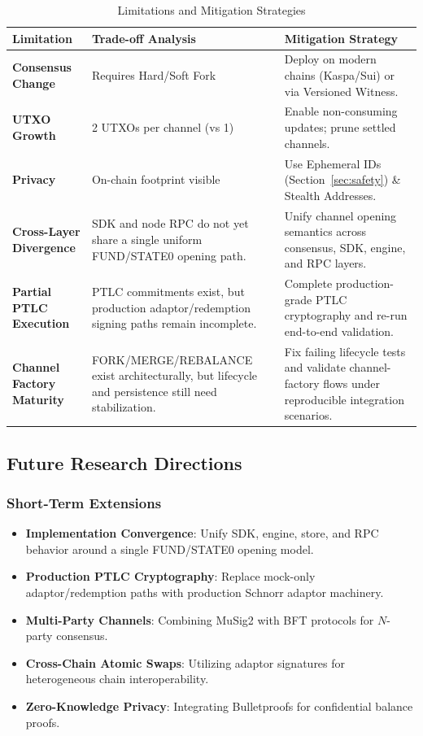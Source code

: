 \begin{table}[htbp]
\centering
\caption{Limitations and Mitigation Strategies}
\label{tab:limitations}
\small
\begin{tabularx}{\linewidth}{@{}l X X@{}}
\toprule
\textbf{Limitation} & \textbf{Trade-off Analysis} & \textbf{Mitigation Strategy} \\
\midrule
\textbf{Consensus Change} & Requires Hard/Soft Fork & Deploy on modern chains (Kaspa/Sui) or via Versioned Witness. \\
\midrule
\textbf{UTXO Growth} & 2 UTXOs per channel (vs 1) & Enable non-consuming updates; prune settled channels. \\
\midrule
\textbf{Privacy} & On-chain footprint visible & Use Ephemeral IDs (Section~\ref{sec:safety}) \& Stealth Addresses. \\
\midrule
\textbf{Cross-Layer Divergence} & SDK and node RPC do not yet share a single uniform FUND/STATE0 opening path. & Unify channel opening semantics across consensus, SDK, engine, and RPC layers. \\
\midrule
\textbf{Partial PTLC Execution} & PTLC commitments exist, but production adaptor/redemption signing paths remain incomplete. & Complete production-grade PTLC cryptography and re-run end-to-end validation. \\
\midrule
\textbf{Channel Factory Maturity} & FORK/MERGE/REBALANCE exist architecturally, but lifecycle and persistence still need stabilization. & Fix failing lifecycle tests and validate channel-factory flows under reproducible integration scenarios. \\
\bottomrule
\end{tabularx}
\end{table}

\subsection{Future Research Directions}

\subsubsection{Short-Term Extensions}
\begin{itemize}
    \item \textbf{Implementation Convergence}: Unify SDK, engine, store, and RPC behavior around a single FUND/STATE0 opening model.
    \item \textbf{Production PTLC Cryptography}: Replace mock-only adaptor/redemption paths with production Schnorr adaptor machinery.
    \item \textbf{Multi-Party Channels}: Combining MuSig2 with BFT protocols for $N$-party consensus.
    \item \textbf{Cross-Chain Atomic Swaps}: Utilizing adaptor signatures for heterogeneous chain interoperability.
    \item \textbf{Zero-Knowledge Privacy}: Integrating Bulletproofs for confidential balance proofs.
\end{itemize}

